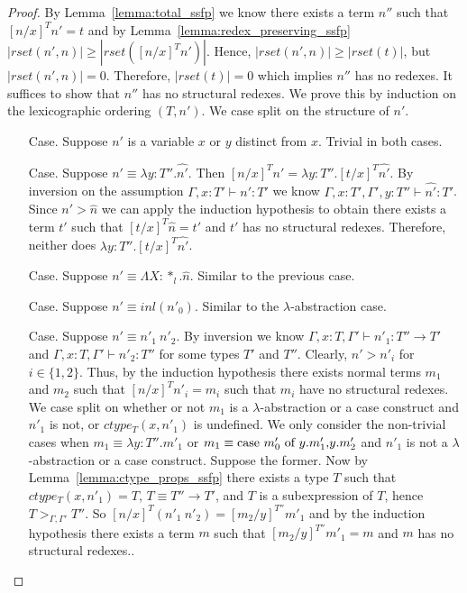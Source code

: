 \begin{proof}
  By Lemma~\ref{lemma:total_ssfp} we know there exists a term $n''$ such that $[n/x]^T n' = t$ and by 
  Lemma~\ref{lemma:redex_preserving_ssfp} 
  $|rset(n', n)| \geq |rset([n/x]^T n')|$.  Hence, $|rset(n', n)| \geq |rset(t)|$, but
  $|rset(n', n)| = 0$.  Therefore, $|rset(t)| = 0$ which implies $n''$ has no redexes.  It suffices to show
  that $n''$ has no structural redexes.  We prove this by induction on the lexicographic ordering $(T,n')$.
  We case split on the structure of $n'$.
\begin{itemize}
\item[Case.] Suppose $n'$ is a variable $x$ or $y$ distinct from $x$.  Trivial in both cases.
  
\item[Case.] Suppose $n' \equiv \lambda y:T''.\hat{n'}$.  Then
  $[n/x]^T n' = \lambda y:T''.[t/x]^T \hat{n'}$. By inversion on the assumption  
  $\Gamma, x:T' \vdash n':T'$ we know $\Gamma, x:T',\Gamma',y:T'' \vdash \hat{n'}:T'$.  Since
  $n' > \hat{n}$ we can apply the induction hypothesis to obtain there exists a term $t'$ such that
  $[t/x]^T \hat{n} = t'$ and $t'$ has no structural redexes.  Therefore, neither does 
  $\lambda y:T''.[t/x]^T \hat{n'}$.
  
\item[Case.] Suppose $n' \equiv \Lambda X:*_l.\hat{n}$.  Similar to the previous case.
  
\item[Case.] Suppose $n' \equiv inl(n'_0)$.  Similar to the $\lambda$-abstraction case.
  
\item[Case.] Suppose $n' \equiv n'_1\ n'_2$.  By inversion we know
  $\Gamma, x:T, \Gamma' \vdash n'_1 : T'' \to T'$ and
  $\Gamma, x:T, \Gamma' \vdash n'_2 : T''$ for some types $T'$ and $T''$.
  Clearly, $n' > n'_i$ for $i \in \{1,2\}$.  Thus, by the induction hypothesis
  there exists normal terms $m_1$ and $m_2$ such that $[n/x]^T n'_i = m_i$ such that $m_i$ have no
  structural redexes.  We case split on whether or not $m_1$ is a $\lambda$-abstraction
  or a case construct and $n'_1$ is not, or $ctype_T(x,n'_1)$ is undefined.  
  We only consider the non-trivial cases when 
  $m_1 \equiv \lambda y:T''.m'_1$ or $m_1 \equiv \mbox{case}\ m'_0\ \text{of}\ y\text{.}m'_1\text{,}y\text{.}m'_2$ and $n'_1$
  is not a $\lambda$-abstraction or a case construct.
  Suppose the former.  
  Now by Lemma~\ref{lemma:ctype_props_ssfp} there exists a type $T$ such that 
  $ctype_T(x, n'_1) = T$, $T \equiv T'' \to T'$, and $T$ is a subexpression
  of $T$, hence $T >_{\Gamma,\Gamma'} T''$. So $[n/x]^T (n'_1\ n'_2) = [m_2/y]^{T''} m'_1$ and
  by the induction hypothesis there exists a term $m$ such that 
  $[m_2/y]^{T''} m'_1 = m$ and $m$ has no structural redexes..  
  

\end{itemize}
\end{proof}
